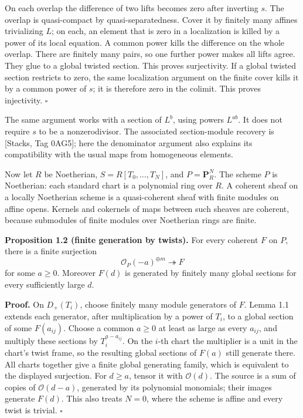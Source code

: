 \documentclass[11pt]{article}
\begin{document}
On each overlap the difference of two lifts becomes zero after inverting
\(s\). The overlap is quasi-compact by quasi-separatedness. Cover it by
finitely many affines trivializing \(L\); on each, an element that is
zero in a localization is killed by a power of its local equation. A
common power kills the difference on the whole overlap. There are
finitely many pairs, so one further power makes all lifts agree. They
glue to a global twisted section. This proves surjectivity. If a global
twisted section restricts to zero, the same localization argument on the
finite cover kills it by a common power of \(s\); it is therefore zero
in the colimit. This proves injectivity. \(\square\)

The same argument works with a section of \(L^b\), using powers
\(L^{ab}\). It does not require \(s\) to be a nonzerodivisor. The
associated section-module recovery is {[}Stacks, Tag 0AG5{]}; here the
denominator argument also explains its compatibility with the usual maps
from homogeneous elements.

Now let \(R\) be Noetherian, \(S=R[T_0,\ldots,T_N]\), and
\(P=\mathbf P_R^N\). The scheme \(P\) is Noetherian: each standard chart
is a polynomial ring over \(R\). A coherent sheaf on a locally
Noetherian scheme is a quasi-coherent sheaf with finite modules on
affine opens. Kernels and cokernels of maps between such sheaves are
coherent, because submodules of finite modules over Noetherian rings are
finite.

\textbf{Proposition 1.2 (finite generation by twists).} For every
coherent \(F\) on \(P\), there is a finite surjection \[
\mathcal O_P(-a)^{\oplus m}\twoheadrightarrow F
\] for some \(a\ge0\). Moreover \(F(d)\) is generated by finitely many
global sections for every sufficiently large \(d\).

\textbf{Proof.} On \(D_+(T_i)\), choose finitely many module generators
of \(F\). Lemma 1.1 extends each generator, after multiplication by a
power of \(T_i\), to a global section of some \(F(a_{ij})\). Choose a
common \(a\ge0\) at least as large as every \(a_{ij}\), and multiply
these sections by \(T_i^{a-a_{ij}}\). On the \(i\)-th chart the
multiplier is a unit in the chart's twist frame, so the resulting global
sections of \(F(a)\) still generate there. All charts together give a
finite global generating family, which is equivalent to the displayed
surjection. For \(d\ge a\), tensor it with \(\mathcal O(d)\). The source
is a sum of copies of \(\mathcal O(d-a)\), generated by its polynomial
monomials; their images generate \(F(d)\). This also treats \(N=0\),
where the scheme is affine and every twist is trivial. \(\square\)
\end{document}
